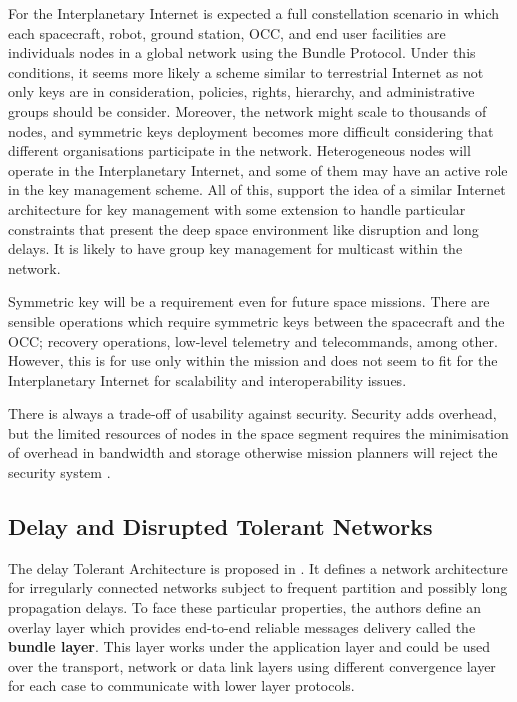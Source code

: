 For the Interplanetary Internet is expected a full constellation scenario in which each spacecraft, robot,  ground station, OCC, and end user facilities are individuals nodes in a global network using the Bundle Protocol. Under this conditions, it seems more likely a scheme similar to terrestrial Internet as not only keys are in consideration, policies, rights, hierarchy,  and administrative groups should be consider. Moreover, the network might scale to thousands of nodes, and symmetric keys deployment becomes more difficult considering that different organisations participate in the network.   
Heterogeneous nodes will operate in the Interplanetary Internet, and some of them may have an active role in the key management scheme. All of this, support the idea of a similar Internet architecture for key management with some extension to handle particular constraints that present the deep space environment like disruption and long delays. It is likely to have group key management for multicast within the network.  



Symmetric key will be a requirement even for future space missions. There are sensible operations which require symmetric keys between the spacecraft and the OCC; recovery operations, low-level telemetry and telecommands, among other.  However, this is for use only within the mission and does not seem to fit for the Interplanetary Internet for scalability and interoperability issues. 



There is always a trade-off of usability against security. Security adds overhead, but the limited resources of nodes in the space segment requires the minimisation of overhead in bandwidth and storage otherwise mission planners will reject the security system \cite{book2012architecture}. 


\subsection{Delay and Disrupted Tolerant Networks}

The delay Tolerant Architecture is proposed in \cite{cerf2007delay}. It defines a network architecture for irregularly connected networks subject to frequent partition and possibly long propagation delays. To face these particular properties, the authors define an overlay layer which provides end-to-end reliable messages delivery called the \textbf{bundle layer}. This layer works under the application layer and could be used over the transport, network or data link layers using different convergence layer for each case to communicate with lower layer protocols. 

